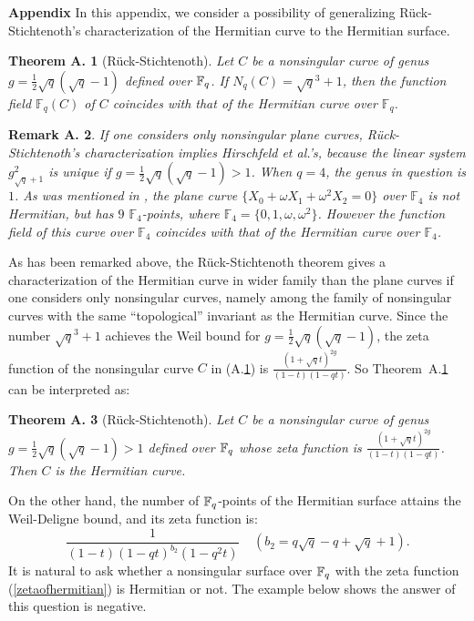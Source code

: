 \documentclass[a4paper,11pt]{article}
\newtheorem{atheorem}{Theorem A.\!\!}
\newtheorem{aremark}[atheorem]{Remark A.\!\!}
\newcommand{\ssgyokan}{\vskip 4pt}
\begin{document}
\vskip 22pt
\noindent
{\bf\Large Appendix}
\vskip 11pt
In this appendix, we consider a possibility of generalizing 
R\"{u}ck-Stichtenoth's characterization of the Hermitian curve
to the Hermitian surface.
\begin{atheorem}[R\"{u}ck-Stichtenoth]\label{RStheorem}
Let $C$ be a nonsingular curve of genus $g= \frac{1}{2}\sqrt{q}(\sqrt{q}-1)$
defined over ${\Bbb F}_q$.
If $N_q(C) = \sqrt{q}^3 +1$,
then the function field $\mathbb{F}_q(C)$ of $C$
coincides with that of the Hermitian curve over $\mathbb{F}_q$.
\end{atheorem}


\begin{aremark}
If one considers only nonsingular plane curves,
R\"{u}ck-Stichtenoth's characterization implies Hirschfeld et al.'s,
because the linear system $g_{\sqrt{q}+1}^2$ is unique if
$g= \frac{1}{2}\sqrt{q}(\sqrt{q}-1) > 1$.
When $q=4$, the genus in question is $1$.
As was mentioned in \cite{hir-sto-tha-vol},
the plane curve
$\{X_0 + \omega X_1 + \omega^2 X_2=0\}$
over $\mathbb{F}_4$
is not Hermitian, but has $9$ $\mathbb{F}_4$-points,
where $\mathbb{F}_4 = \{0, 1, \omega , \omega^2\}$.
However the function field of this curve over $\mathbb{F}_4$
coincides with that of the Hermitian curve over $\mathbb{F}_4$.
\end{aremark}

\ssgyokan

As has been remarked above,
the R\"{u}ck-Stichtenoth theorem gives a characterization
of the Hermitian curve in wider family than the plane curves
if one considers only nonsingular curves, namely
among the family of nonsingular curves with the same ``topological'' invariant
as the Hermitian curve.
Since the number $\sqrt{q}^3 +1$ achieves the Weil bound
for $g= \frac{1}{2}\sqrt{q}(\sqrt{q}-1) $,
the zeta function of the nonsingular curve $C$ in (A.\ref{RStheorem})
is $\frac{(1+\sqrt{q}t)^{2g}}{(1-t)(1-qt)}$.
So Theorem~A.\ref{RStheorem} can be interpreted as:
\begin{atheorem}[R\"{u}ck-Stichtenoth]
Let $C$ be a nonsingular curve of genus $g= \frac{1}{2}\sqrt{q}(\sqrt{q}-1) >1$
defined over ${\Bbb F}_q$
whose zeta function is $\frac{(1+\sqrt{q}t)^{2g}}{(1-t)(1-qt)}$.
Then $C$ is the Hermitian curve.
\end{atheorem}


On the other hand,
the number of ${\Bbb F}_q$-points of
the Hermitian surface attains the Weil-Deligne bound,
and its zeta function is:
\begin{equation}\label{zetaofhermitian}
 \frac{1}{(1-t)(1-qt)^{b_2}(1-q^2t)}  \ \ \ \ \ 
 (b_2 =q\sqrt{q} -q + \sqrt{q} + 1).
\end{equation}
It is natural to ask whether a nonsingular surface over ${\Bbb F}_q$
with the zeta function (\ref{zetaofhermitian}) is Hermitian or not.
The example below shows the answer of this question is negative.
\end{document}

